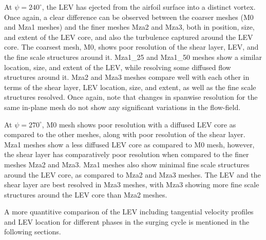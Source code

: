 At $\psi=240^\circ$, the LEV has ejected from the airfoil surface into a distinct vortex. Once again, a clear difference can be observed between the coarser meshes (M0 and Mza1 meshes) and the finer meshes Mza2 and Mza3, both in position, size, and extent of the LEV core, and also the turbulence captured around the LEV core. The coarsest mesh, M0, shows poor resolution of the shear layer, LEV, and the fine scale structures around it. Mza1\_25 and Mza1\_50 meshes show a similar location, size, and extent of the LEV, while resolving some diffused flow structures around it. Mza2 and Mza3 meshes compare well with each other in terms of the shear layer, LEV location, size, and extent, as well as the fine scale structures resolved. Once again, note that changes in spanwise resolution for the same in-plane mesh do not show any significant variations in the flow-field. 

At $\psi=270^\circ$, M0 mesh shows poor resolution with a diffused LEV core as compared to the other meshes, along with poor resolution of the shear layer. Mza1 meshes show a less diffused LEV core as compared to M0 mesh, however, the shear layer has comparatively poor resolution when compared to the finer meshes Mza2 and Mza3. Mza1 meshes also show minimal fine scale structures around the LEV core, as compared to Mza2 and Mza3 meshes. The LEV and the shear layer are best resolved in Mza3 meshes, with Mza3 showing more fine scale structures around the LEV core than Mza2 meshes.

A more quantitive comparison of the LEV including tangential velocity profiles and LEV location for different phases in the surging cycle is mentioned in the following sections.



